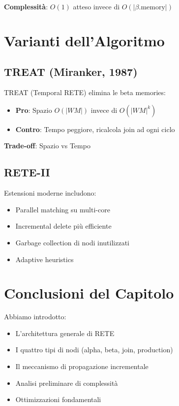 \textbf{Complessità}: $O(1)$ atteso invece di $O(|\beta.\text{memory}|)$

\section{Varianti dell'Algoritmo}

\subsection{TREAT (Miranker, 1987)}

TREAT (Temporal RETE) elimina le beta memories:

\begin{itemize}
\item \textbf{Pro}: Spazio $O(|WM|)$ invece di $O(|WM|^k)$
\item \textbf{Contro}: Tempo peggiore, ricalcola join ad ogni ciclo
\end{itemize}

\textbf{Trade-off}: Spazio vs Tempo

\subsection{RETE-II}

Estensioni moderne includono:
\begin{itemize}
\item Parallel matching su multi-core
\item Incremental delete più efficiente
\item Garbage collection di nodi inutilizzati
\item Adaptive heuristics
\end{itemize}

\section{Conclusioni del Capitolo}

Abbiamo introdotto:

\begin{itemize}
\item L'architettura generale di RETE
\item I quattro tipi di nodi (alpha, beta, join, production)
\item Il meccanismo di propagazione incrementale
\item Analisi preliminare di complessità
\item Ottimizzazioni fondamentali
\end{itemize}


